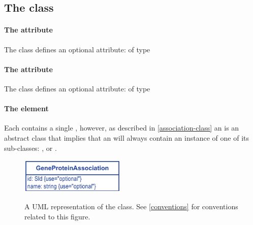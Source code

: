 \subsection{The \FBC {} class}
\label{geneproteinassociation-class}


\paragraph{The  attribute}
The \GeneProteinAssociation class defines an optional attribute:  of type 

\paragraph{The  attribute}
The \GeneProteinAssociation class defines an optional attribute:  of type 


\paragraph{The  element}
Each \GeneProteinAssociation contains a single \Association, however, as described in \ref{association-class} an \Association is an abstract class that implies that an  will always contain an instance of one of its sub-classes: \GeneAnd, \GeneOr or \GeneProductRef.
%
\begin{figure}[h!]
  \centering
  \includegraphics[width=5cm]{images/v2harmony_fbc_geneproductassociation.pdf}\\
  \caption{A UML representation of the \FBCPackage \GeneProteinAssociation class.
	See  \ref{conventions} for conventions related to this figure.}
  \label{fig:fbc_uml_ga}
\end{figure}


